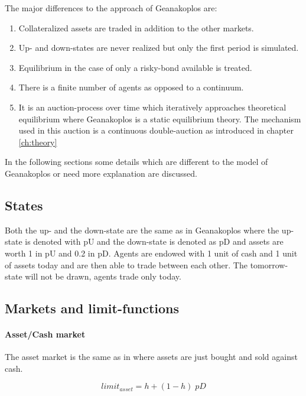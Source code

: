 \documentclass[../Bachelorarbeit.tex]{subfiles}
\begin{document}
The major differences to the approach of Geanakoplos are:
\begin{enumerate}
\item Collateralized assets are traded in addition to the other markets.
\item Up- and down-states are never realized but only the first period is simulated.
\item Equilibrium in the case of only a risky-bond available is treated.
\item There is a finite number of agents as opposed to a continuum.
\item It is an auction-process over time which iteratively approaches theoretical equilibrium where Geanakoplos is a static equilibrium theory. The mechanism used in this auction is a continuous double-auction as introduced in chapter \ref{ch:theory}
\end{enumerate}

In the following sections some details which are different to the model of Geanakoplos or need more explanation are discussed.

\subsection{States}
Both the up- and the down-state are the same as in Geanakoplos where the up-state is denoted with pU and the down-state is denoted as pD and assets are worth 1 in pU and 0.2 in pD. Agents are endowed with 1 unit of cash and 1 unit of assets today and are then able to trade between each other. The tomorrow-state will not be drawn, agents trade only today.

\subsection{Markets and limit-functions}
\label{sec:LIMIT_FUNCTIONS}

\paragraph{Asset/Cash market}
The asset market is the same as in \cite{Geanakoplos2009} where assets are just bought and sold against cash.

\begin{equation}
limit_{asset} = h + ( 1 - h ) \; pD
\end{equation}
\end{document}
